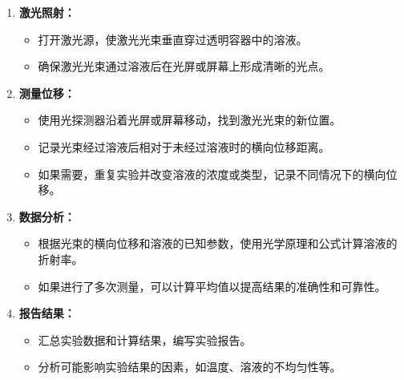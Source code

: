 \documentclass[dvipsnames, svgnames,a4paper,11pt]{article}
\begin{document}
\begin{enumerate}
\begin{enumerate}
\begin{enumerate}
				\item \textbf{激光照射：}
				\begin{itemize}
					\item 打开激光源，使激光光束垂直穿过透明容器中的溶液。
					\item 确保激光光束通过溶液后在光屏或屏幕上形成清晰的光点。
				\end{itemize}
				
				\item \textbf{测量位移：}
				\begin{itemize}
					\item 使用光探测器沿着光屏或屏幕移动，找到激光光束的新位置。
					\item 记录光束经过溶液后相对于未经过溶液时的横向位移距离。
					\item 如果需要，重复实验并改变溶液的浓度或类型，记录不同情况下的横向位移。
				\end{itemize}
				
				\item \textbf{数据分析：}
				\begin{itemize}
					\item 根据光束的横向位移和溶液的已知参数，使用光学原理和公式计算溶液的折射率。
					\item 如果进行了多次测量，可以计算平均值以提高结果的准确性和可靠性。
				\end{itemize}
				
				\item \textbf{报告结果：}
				\begin{itemize}
					\item 汇总实验数据和计算结果，编写实验报告。
					\item 分析可能影响实验结果的因素，如温度、溶液的不均匀性等。
				\end{itemize}
			\end{enumerate}
		\end{enumerate}
	\end{enumerate}
	
\end{document}
